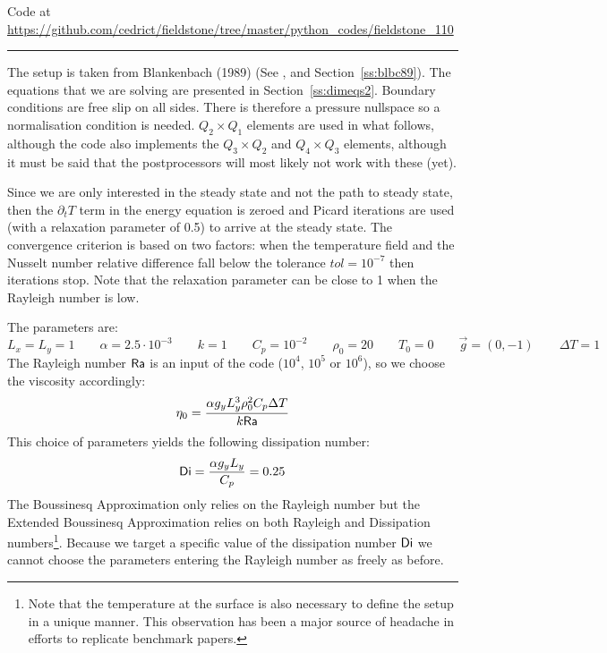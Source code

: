 

\begin{center}
Code at \url{https://github.com/cedrict/fieldstone/tree/master/python_codes/fieldstone_110}
\end{center}

\par\noindent\rule{\textwidth}{0.4pt}



The setup is taken from Blankenbach \etal (1989) \cite{blbc89} (See , and Section~\ref{ss:blbc89}). 
The equations that we are solving are presented in Section~\ref{ss:dimeqs2}. 
Boundary conditions are free slip on all sides. There is therefore a pressure nullspace
so a normalisation condition is needed.
$Q_2\times Q_1$ elements are used in what follows, although the code also implements 
the $Q_3\times Q_2$ and $Q_4\times Q_3$ elements, although it must be said that the 
postprocessors will most likely not work with these (yet). 

Since we are only interested in the steady state and not the path to steady state, 
then the $\partial_t T$ term in the energy equation is zeroed and Picard iterations
are used (with a relaxation parameter of 0.5) to arrive at the steady state.
The convergence criterion is based on two factors: when the temperature field and the Nusselt number 
relative difference fall below the tolerance $tol=10^{-7}$ then iterations stop.
Note that the relaxation parameter can be close to 1 when the Rayleigh number is low.

The parameters are:
\[
L_x=L_y=1
\qquad
\alpha=2.5\cdot 10^{-3}
\qquad
k=1
\qquad
C_p=10^{-2}
\qquad
\rho_0=20
\qquad
T_0=0
\qquad
\vec{g}=(0,-1)
\qquad
\Delta T = 1
\]
The Rayleigh number ${\mathsf{Ra}}$ is an input of the code ($10^4$, $10^5$ or $10^6$), so 
we choose the viscosity accordingly:
\[
\eta_0 = \frac{\alpha g_y L_y^3 \rho_0^2 C_p \Delta T}{k {\mathsf{Ra}}}
\]
This choice of parameters yields the following dissipation number:
\[
{\mathsf{Di}}=\frac{\alpha g_y L_y}{C_p} = 0.25
\]
The Boussinesq Approximation only relies on the Rayleigh number but the 
Extended Boussinesq Approximation relies on both Rayleigh and Dissipation numbers\footnote{Note that 
the temperature at the surface is also necessary to define the setup in a unique manner. This observation
has been a major source of headache in efforts to replicate benchmark papers.}. 
Because we target a specific value of the dissipation number ${\mathsf{Di}}$ we cannot choose the 
parameters entering the Rayleigh number as freely as before.

